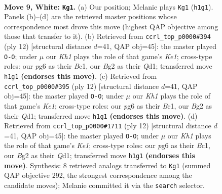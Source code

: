 \documentclass[11pt]{article}
\begin{document}
\clearpage

\begin{figure}[p]\centering
\begin{subfigure}{0.46\textwidth}\centering
\resizebox{\linewidth}{!}{%
\newchessgame
\chessboard[
  setfen={rnbq1rk1/pp2p1b1/3p1np1/2p2p1p/2PP4/2N2NP1/PP2PPBP/R1BQ1R1K w - - 0 9},
  showmover=false,
  pgfstyle=straightmove, color=movearrow, markmove={h1-g1}
]}
\caption{}
\end{subfigure}\hfill
\begin{subfigure}{0.46\textwidth}\centering
\resizebox{\linewidth}{!}{%
\newchessgame
\chessboard[
  setfen={rnbq1rk1/pp2ppbp/3p1np1/2p5/2PP4/2N2NP1/PP2PPBP/R1BQK2R w KQ - 0 7},
  showmover=false,
  pgfstyle=straightmove, color=movearrow, markmove={e1-g1}
]}
\caption{}
\end{subfigure}
\\[4pt]
\begin{subfigure}{0.46\textwidth}\centering
\resizebox{\linewidth}{!}{%
\newchessgame
\chessboard[
  setfen={rnbq1rk1/pp2ppbp/3p1np1/2p5/2PP4/2N2NP1/PP2PPBP/R1BQK2R w KQ - 0 7},
  showmover=false,
  pgfstyle=straightmove, color=movearrow, markmove={e1-g1}
]}
\caption{}
\end{subfigure}\hfill
\begin{subfigure}{0.46\textwidth}\centering
\resizebox{\linewidth}{!}{%
\newchessgame
\chessboard[
  setfen={rnbq1rk1/pp2ppbp/3p1np1/2p5/2PP4/2N2NP1/PP2PPBP/R1BQK2R w KQ - 0 7},
  showmover=false,
  pgfstyle=straightmove, color=movearrow, markmove={e1-g1}
]}
\caption{}
\end{subfigure}
\caption{\textbf{Move 9, White: \texttt{Kg1}.} (a) Our position; Melanie plays \texttt{Kg1} (\texttt{h1g1}). Panels (b)--(d) are the retrieved master positions whose correspondence most drove this move (highest QAP objective among those that transfer to it). (b) Retrieved from \texttt{ccrl\_top\_p0000\#394} (ply 12) [structural distance $d$=41, QAP obj=45]: the master played \texttt{O-O}; under $\mu$ our \emph{Kh1} plays the role of that game's \emph{Ke1}; cross-type roles: our \emph{p}g6 as their \emph{B}c1, our \emph{B}g2 as their \emph{Q}d1; transferred move \texttt{h1g1} \textbf{(endorses this move)}. (c) Retrieved from \texttt{ccrl\_top\_p0000\#395} (ply 12) [structural distance $d$=41, QAP obj=45]: the master played \texttt{O-O}; under $\mu$ our \emph{Kh1} plays the role of that game's \emph{Ke1}; cross-type roles: our \emph{p}g6 as their \emph{B}c1, our \emph{B}g2 as their \emph{Q}d1; transferred move \texttt{h1g1} \textbf{(endorses this move)}. (d) Retrieved from \texttt{ccrl\_top\_p0000\#1711} (ply 12) [structural distance $d$=41, QAP obj=45]: the master played \texttt{O-O}; under $\mu$ our \emph{Kh1} plays the role of that game's \emph{Ke1}; cross-type roles: our \emph{p}g6 as their \emph{B}c1, our \emph{B}g2 as their \emph{Q}d1; transferred move \texttt{h1g1} \textbf{(endorses this move)}. Synthesis: 8 retrieved analogs transferred to \texttt{Kg1} (summed QAP objective 292, the strongest correspondence among the candidate moves); Melanie committed it via the \texttt{search} selector.}
\label{fig:thought-m16}
\end{figure}
\end{document}
